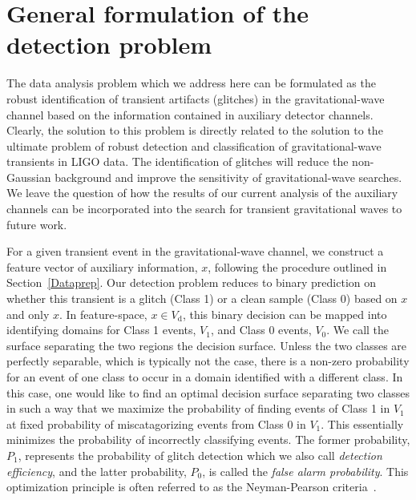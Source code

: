 \documentclass[prd, twocolumn, lengthcheck, superscriptaddress, showpacs, letterpaper, nofootinbib]{revtex4-1}
\newcommand\auxvec{x}
\newcommand\Vdata{V_\mathrm{d}}
\begin{document}
\section{General formulation of the detection problem}
\label{detection_problem}

The data analysis problem which we address here can be formulated as the robust identification of transient artifacts (glitches) in the gravitational-wave channel based on the information contained in auxiliary detector channels. Clearly, the solution to this problem is directly related to the solution to the ultimate problem of robust detection and classification of gravitational-wave transients in \ac{LIGO} data. The identification of glitches will reduce the non-Gaussian background and improve the sensitivity of gravitational-wave searches.%
We leave the question of how the results of our current analysis of the auxiliary channels can be incorporated into the search for transient gravitational waves to future work. 

For a given transient event in the gravitational-wave channel, we construct a
feature vector of auxiliary information, $\auxvec$, following the procedure
outlined in Section~\ref{Dataprep}. Our detection problem reduces to binary
prediction on whether this transient is a glitch (Class 1) or a clean sample
(Class 0) based on $\auxvec$ and only $\auxvec$. In feature-space, $\auxvec \in
\Vdata$, this binary decision can be mapped into identifying domains for Class
1 events, $V_1$, and Class 0 events, $V_0$. We call the surface separating the
two regions the decision surface. Unless the two classes are perfectly
separable, which is typically not the case, there is a non-zero probability for
an event of one class to occur in a domain identified with a different class.
In this case, one would like to find an optimal decision surface separating two
classes in such a way that we maximize the probability of finding events of
Class 1 in $V_1$ at fixed probability of miscatagorizing events from Class 0 in
$V_1$.  This essentially minimizes the probability of incorrectly classifying
events.  The former probability, $P_{1}$, represents the probability of glitch
detection which we also call {\em detection efficiency}, and the latter
probability, $P_{0}$, is called the {\em false alarm probability}. This
optimization principle is often referred to as the Neyman-Pearson
criteria~\cite{neyman-1933}. 
\end{document}
